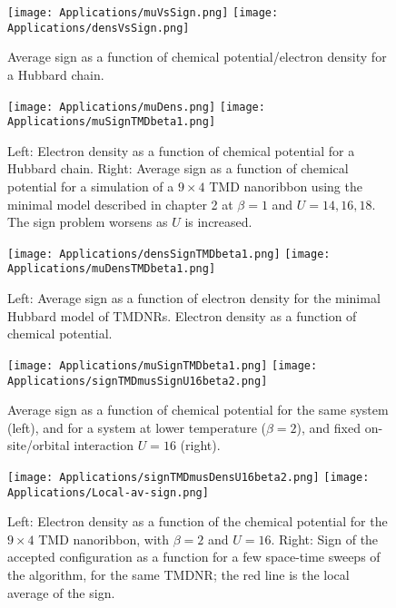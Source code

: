 \begin{figure}[H]
\texttt{[image: Applications/muVsSign.png]}
\texttt{[image: Applications/densVsSign.png]}
	\caption[Average sign as a function of chemical potential/electron density for a Hubbard chain.]{Average sign as a function of chemical potential/electron density for a Hubbard chain.}
	\label{fig:signMuDens}
\end{figure}
\begin{figure}[H]
\texttt{[image: Applications/muDens.png]}
\texttt{[image: Applications/muSignTMDbeta1.png]}
	\caption[Electron density as a function of chemical potential for a Hubbard chain. Average sign as a function of chemical potential for a simulation of a $9 \times 4$ TMD nanoribbon using the minimal model described in chapter 2.]{Left: Electron density as a function of chemical potential for a Hubbard chain.
	Right: Average sign as a function of chemical potential for a simulation of a $9 \times 4$ TMD nanoribbon using the minimal model described in chapter 2 at $\beta = 1$ and $U = 14, 16, 18$.
	The sign problem worsens as $U$ is increased.}
	\label{fig:muSign}
\end{figure}
\begin{figure}[H]
\texttt{[image: Applications/densSignTMDbeta1.png]}
\texttt{[image: Applications/muDensTMDbeta1.png]}
	\caption[Average sign as a function of electron density for the minimal Hubbard model of \acs{TMDNR}s. Electron density as a function of chemical potential.]{Left: Average sign as a function of electron density for the minimal Hubbard model of \acs{TMDNR}s. Electron density as a function of chemical potential.}
	\label{fig:densSignmuDens}
\end{figure}
\begin{figure}[H]
\texttt{[image: Applications/muSignTMDbeta1.png]}
\texttt{[image: Applications/signTMDmusSignU16beta2.png]}
	\caption[Average sign as a function of chemical potential for the same system, and for a system at lower temperature ($\beta = 2$), and fixed on-site/orbital interaction $U = 16$.]{Average sign as a function of chemical potential for the same system (left), and for a system at lower temperature ($\beta = 2$), and fixed on-site/orbital interaction $U = 16$ (right).}
	\label{fig:muDensU16signDens}
\end{figure}
\begin{figure}[H]
\texttt{[image: Applications/signTMDmusDensU16beta2.png]}
\texttt{[image: Applications/Local-av-sign.png]}
	\caption[Electron density as a function of the chemical potential for the $9 \times 4$ \acs{TMD} nanoribbon, with $\beta = 2$ and $U = 16$. Sign of the accepted configuration as a function for a few space-time sweeps of the algorithm.]{Left: Electron density as a function of the chemical potential for the $9 \times 4$ \acs{TMD} nanoribbon, with $\beta = 2$ and $U = 16$.
	Right: Sign of the accepted configuration as a function for a few space-time sweeps of the algorithm, for the same \acs{TMDNR}; the red line is the local average of the sign.}
	\label{fig:SignLoc}
\end{figure}

